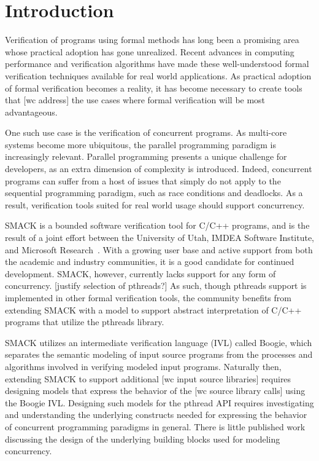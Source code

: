 \chapter{Introduction}\label{thesis_intro}

Verification of programs using formal methods has long been a
promising area whose practical adoption has gone unrealized.  Recent
advances in computing performance and verification algorithms have
made these well-understood formal verification techniques available
for real world applications.  As practical adoption of formal
verification becomes a reality, it has become necessary to create
tools that [wc address] the use cases where formal verification will
be most advantageous. 

One such use case is the verification of concurrent programs.  As
multi-core systems become more ubiquitous, the parallel programming
paradigm is increasingly relevant.  Parallel programming presents a
unique challenge for developers, as an extra dimension of complexity
is introduced.  Indeed, concurrent programs can suffer from a host of
issues that simply do not apply to the sequential programming
paradigm, such as race conditions and deadlocks.  As a result,
verification tools suited for real world usage should support
concurrency.

SMACK is a bounded software verification tool for C/C++ programs, and
is the result of a joint effort between the University of Utah, IMDEA
Software Institute, and Microsoft Research~\cite{smack}.  With a
growing user base and active support from both the academic and
industry communities, it is a good candidate for continued
development.  SMACK, however, currently lacks support for any form of
concurrency.  [justify selection of pthreads?]  As such, though
pthreads support is implemented in other formal verification tools,
the community benefits from extending SMACK with a model to support
abstract interpretation of C/C++ programs that utilize the pthreads
library. 

SMACK utilizes an intermediate verification language (IVL) called
Boogie, which separates the semantic modeling of input source programs
from the processes and algorithms involved in verifying modeled input
programs.  Naturally then, extending SMACK to support additional [wc
input source libraries] requires designing models that express the
behavior of the [wc source library calls] using the Boogie IVL.
Designing such models for the pthread API requires investigating and
understanding the underlying constructs needed for expressing the
behavior of concurrent programming paradigms in general.  There is
little published work discussing the design of the underlying building
blocks used for modeling concurrency. 

